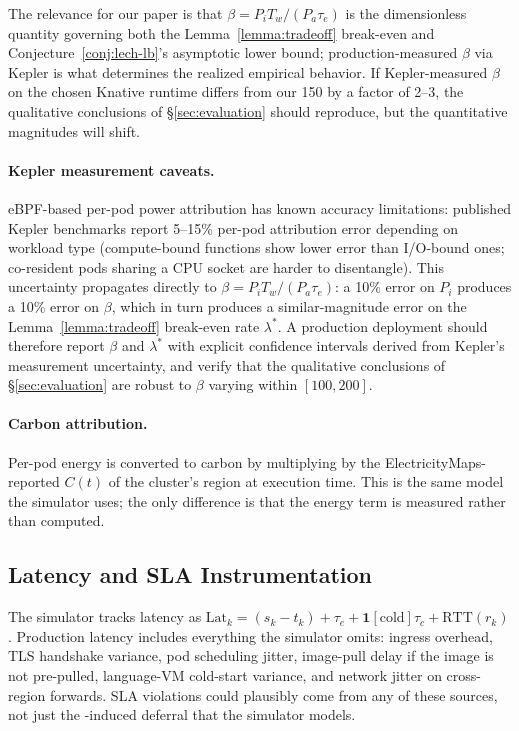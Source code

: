 The relevance for our paper is that $\beta = P_i T_w / (P_a \tau_e)$
is the dimensionless quantity governing both the
Lemma~\ref{lemma:tradeoff} break-even and
Conjecture~\ref{conj:lech-lb}'s asymptotic lower bound;
production-measured $\beta$ via Kepler is what determines the realized
empirical behavior. If Kepler-measured $\beta$ on the chosen Knative
runtime differs from our 150 by a factor of 2--3, the qualitative
conclusions of \S\ref{sec:evaluation} should reproduce, but the
quantitative magnitudes will shift.

\paragraph{Kepler measurement caveats.} eBPF-based per-pod power
attribution has known accuracy limitations: published Kepler
benchmarks report 5--15\% per-pod attribution error depending on
workload type (compute-bound functions show lower error than
I/O-bound ones; co-resident pods sharing a CPU socket are harder to
disentangle). This uncertainty propagates directly to $\beta = P_i
T_w / (P_a \tau_e)$: a 10\% error on $P_i$ produces a 10\% error on
$\beta$, which in turn produces a similar-magnitude error on the
Lemma~\ref{lemma:tradeoff} break-even rate $\lambda^*$. A production
deployment should therefore report $\beta$ and $\lambda^*$ with
explicit confidence intervals derived from Kepler's measurement
uncertainty, and verify that the qualitative conclusions of
\S\ref{sec:evaluation} are robust to $\beta$ varying within
$[100, 200]$.

\paragraph{Carbon attribution.}
Per-pod energy is converted to carbon by multiplying by the
ElectricityMaps-reported $C(t)$ of the cluster's region at execution
time. This is the same model the simulator uses; the only
difference is that the energy term is measured rather than computed.

\subsection{Latency and SLA Instrumentation}
\label{sec:deployment:latency}

The simulator tracks latency as $\mathrm{Lat}_k = (s_k - t_k) +
\tau_e + \mathbf{1}[\text{cold}] \tau_c + \mathrm{RTT}(r_k)$. Production
latency includes everything the simulator omits: ingress overhead,
TLS handshake variance, pod scheduling jitter, image-pull delay if
the image is not pre-pulled, language-VM cold-start variance, and
network jitter on cross-region forwards. SLA violations could
plausibly come from any of these sources, not just the
\GreenFaaS{}-induced deferral that the simulator models.


